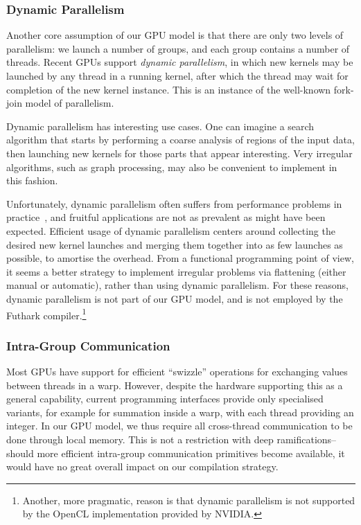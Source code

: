 \subsubsection{Dynamic Parallelism}

Another core assumption of our GPU model is that there are only two
levels of parallelism: we launch a number of groups, and each group
contains a number of threads.  Recent GPUs support \textit{dynamic
  parallelism}, in which new kernels may be launched by any thread in
a running kernel, after which the thread may wait for completion of
the new kernel instance.  This is an instance of the well-known
fork-join model of parallelism.

Dynamic parallelism has interesting use cases.  One can imagine a
search algorithm that starts by performing a coarse analysis of
regions of the input data, then launching new kernels for those parts
that appear interesting.  Very irregular algorithms, such as graph
processing, may also be convenient to implement in this fashion.

Unfortunately, dynamic parallelism often suffers from performance
problems in
practice~\cite{dimarco2013performance,wang2014characterization}, and
fruitful applications are not as prevalent as might have been
expected.  Efficient usage of dynamic parallelism centers around
collecting the desired new kernel launches and merging them together
into as few launches as possible, to amortise the overhead.  From a
functional programming point of view, it seems a better strategy to
implement irregular problems via flattening (either manual or
automatic), rather than using dynamic parallelism.  For these reasons,
dynamic parallelism is not part of our GPU model, and is not employed
by the Futhark compiler.\footnote{Another, more pragmatic, reason is
  that dynamic parallelism is not supported by the OpenCL
  implementation provided by NVIDIA.}

\subsubsection{Intra-Group Communication}

Most GPUs have support for efficient ``swizzle'' operations for
exchanging values between threads in a warp.  However, despite the
hardware supporting this as a general capability, current programming
interfaces provide only specialised variants, for example for
summation inside a warp, with each thread providing an integer.  In
our GPU model, we thus require all cross-thread communication to be
done through local memory.  This is not a restriction with deep
ramifications--should more efficient intra-group communication
primitives become available, it would have no great overall impact on
our compilation strategy.

